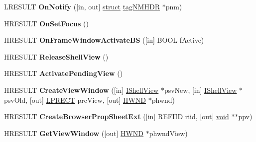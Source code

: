 \begin{DoxyCompactItemize}
\mbox{\label{interface_i_browser_service2_a91cdc0b07bca4695b34c4a77d67d2d88}} 
L\+R\+E\+S\+U\+LT {\bfseries On\+Notify} (\mbox{[}in, out\mbox{]} \hyperlink{interfacestruct}{struct} \hyperlink{structtag_n_m_h_d_r}{tag\+N\+M\+H\+DR} $\ast$pnm)
\item 
\mbox{\label{interface_i_browser_service2_a65875af33328e03ca01d8ad535c43677}} 
H\+R\+E\+S\+U\+LT {\bfseries On\+Set\+Focus} ()
\item 
\mbox{\label{interface_i_browser_service2_a22393f2e5f4e43fe6df3e2dc8b244d0a}} 
H\+R\+E\+S\+U\+LT {\bfseries On\+Frame\+Window\+Activate\+BS} (\mbox{[}in\mbox{]} B\+O\+OL f\+Active)
\item 
\mbox{\label{interface_i_browser_service2_aeade0e6a85b571776f096de7416035d7}} 
H\+R\+E\+S\+U\+LT {\bfseries Release\+Shell\+View} ()
\item 
\mbox{\label{interface_i_browser_service2_a78a525def0a9a1397b3c639d703e70aa}} 
H\+R\+E\+S\+U\+LT {\bfseries Activate\+Pending\+View} ()
\item 
\mbox{\label{interface_i_browser_service2_aa28c2baa92822540a618c8cce338dba2}} 
H\+R\+E\+S\+U\+LT {\bfseries Create\+View\+Window} (\mbox{[}in\mbox{]} \hyperlink{interface_i_shell_view}{I\+Shell\+View} $\ast$psv\+New, \mbox{[}in\mbox{]} \hyperlink{interface_i_shell_view}{I\+Shell\+View} $\ast$psv\+Old, \mbox{[}out\mbox{]} \hyperlink{structtag_r_e_c_t}{L\+P\+R\+E\+CT} prc\+View, \mbox{[}out\mbox{]} \hyperlink{interfacevoid}{H\+W\+ND} $\ast$phwnd)
\item 
\mbox{\label{interface_i_browser_service2_a48caae46379b39c2f724aff73e2ad603}} 
H\+R\+E\+S\+U\+LT {\bfseries Create\+Browser\+Prop\+Sheet\+Ext} (\mbox{[}in\mbox{]} R\+E\+F\+I\+ID riid, \mbox{[}out\mbox{]} \hyperlink{interfacevoid}{void} $\ast$$\ast$ppv)
\item 
\mbox{\label{interface_i_browser_service2_aadb2b92f5c8007a5fa801758af89759c}} 
H\+R\+E\+S\+U\+LT {\bfseries Get\+View\+Window} (\mbox{[}out\mbox{]} \hyperlink{interfacevoid}{H\+W\+ND} $\ast$phwnd\+View)
$$
\end{DoxyCompactItemize}
